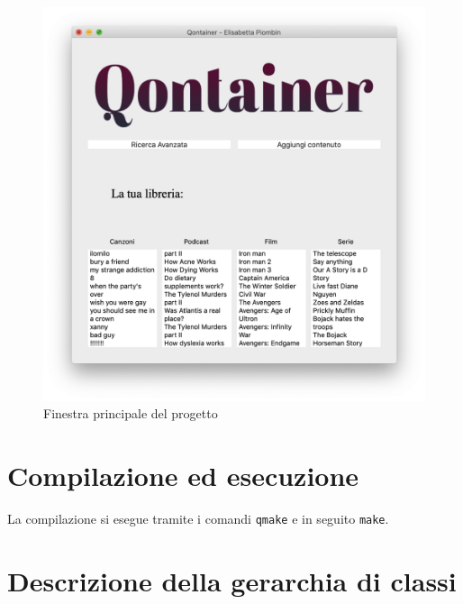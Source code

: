 \documentclass[a4paper,10pt]{article}
\begin{document}
\begin{figure}[H]
	\begin{center}
		\includegraphics[width=\textwidth,keepaspectratio]{MainWIndow.png}
	\end{center}
	\caption{\label{fig:my-label} Finestra principale del progetto}
\end{figure}


\section{Compilazione ed esecuzione}
La compilazione si esegue tramite i comandi \texttt{qmake} e in seguito \texttt{make}. 

\section{Descrizione della gerarchia di classi}
\end{document}
